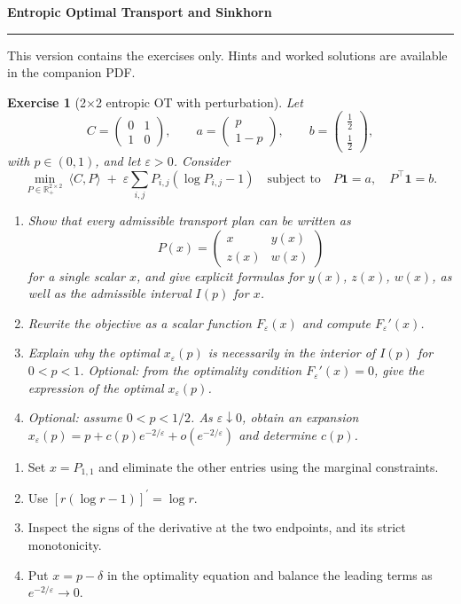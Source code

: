 \documentclass[11pt,a4paper]{article}
\theoremstyle{exostyle}
\newtheorem{exercise}{Exercise}
\newif\ifcorr
\newcommand{\R}{\mathbb{R}}
\newcommand{\ip}[2]{\langle #1,#2\rangle}
\renewcommand{\maketitle}{\thispagestyle{plain}\begingroup
  \color{heading}\LARGE\bfseries\SheetTitle\par\endgroup
  \vspace{3pt}{\large\ifcorr Statements, hints and worked solutions\else Exercise statements\fi}\par
  \vspace{7pt}\hrule\vspace{9pt}
  \ifcorr Each exercise is followed by question-by-question hints and a worked solution.
  Try the questions before reading the hints.\else
  This version contains the exercises only. Hints and worked solutions are available in the companion PDF.\fi
  \par\medskip}
\newcommand{\SheetTitle}{Entropic Optimal Transport and Sinkhorn}
\begin{document}
\maketitle

\begin{exercise}[2$\times$2 entropic OT with perturbation]\label{ex:2x2-entropic-4parts}
Let
\[
C=\begin{pmatrix}
0 & 1\\
1 & 0
\end{pmatrix},\qquad
a=\begin{pmatrix}p\\ 1-p\end{pmatrix},\qquad
b=\begin{pmatrix}\tfrac12\\ \tfrac12\end{pmatrix},
\]
with $p\in(0,1)$, and let $\varepsilon>0$. Consider
\[
\min_{P\in\R_+^{2\times 2}} \ \ip{C}{P}
\;+\;
\varepsilon \sum_{i,j} P_{i,j}(\log P_{i,j}-1)
\quad\text{subject to}\quad
P\mathbf 1 = a,\quad P^\top \mathbf 1 = b.
\]
\begin{enumerate}[label=\textbf{(\arabic*)}]
  \item Show that every admissible transport plan can be written as
  \[
  P(x) =
  \begin{pmatrix}
  x & y(x)\\
  z(x) & w(x)
  \end{pmatrix}
  \]
  for a single scalar $x$, and give explicit formulas for $y(x)$, $z(x)$, $w(x)$, as well as the admissible interval $I(p)$ for $x$.
  \item Rewrite the objective as a scalar function $F_\varepsilon(x)$ and compute $F_\varepsilon'(x)$.
  \item Explain why the optimal $x_\varepsilon(p)$ is necessarily in the interior of $I(p)$ for $0<p<1$.
    Optional: from the optimality condition $F_\varepsilon'(x)=0$, give the expression of the optimal $x_\varepsilon(p)$.
  \item Optional: assume $0<p<1/2$. As $\varepsilon\downarrow0$, obtain an expansion $x_\varepsilon(p)=p+c(p)e^{-2/\varepsilon}+o(e^{-2/\varepsilon})$ and determine $c(p)$.
\end{enumerate}
\end{exercise}
\begin{hints}
\begin{enumerate}[label=(\arabic*)]\item Set $x=P_{1,1}$ and eliminate the other entries using the marginal constraints.\item Use $[r(\log r-1)]^\prime=\log r$.\item Inspect the signs of the derivative at the two endpoints, and its strict monotonicity.\item Put $x=p-\delta$ in the optimality equation and balance the leading terms as $e^{-2/\varepsilon}\to0$.\end{enumerate}
\end{hints}
\end{document}
